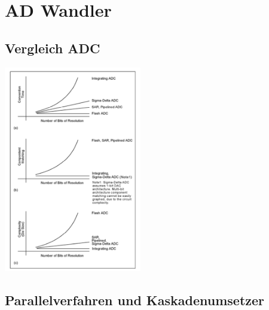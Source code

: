 \section{AD Wandler }

\subsection{Vergleich ADC}
\includegraphics[width=6cm, valign=t]{pictures/vergleich_ADC.png}

\newpage
\subsection{Parallelverfahren und Kaskadenumsetzer}

